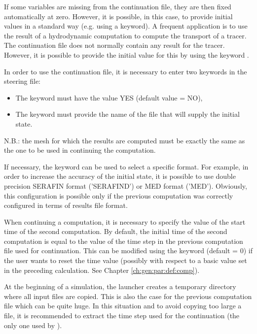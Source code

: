 If some variables are missing from the continuation file,
they are then fixed automatically at zero.
However, it is possible, in this case, to provide initial values in a standard
way (e.g. using a keyword).
A frequent application is to use the result of a hydrodynamic computation
to compute the transport of a tracer.
The continuation file does not normally contain any result for the tracer.
However, it is possible to provide the initial value for this by using
the keyword .

In order to use the continuation file, it is necessary to enter
two keywords in the steering file:

\begin{itemize}
\item The keyword  must have the value YES
(default value = NO),

\item The keyword  must provide
the name of the file that will supply the initial state.
\end{itemize}

N.B.: the mesh for which the results are computed must be exactly the same
as the one to be used in continuing the computation.

If necessary, the keyword 
can be used to select a specific format.
For example, in order to increase the accuracy of the initial state,
it is possible to use double precision SERAFIN format ('SERAFIND') or
MED format ('MED').
Obviously, this configuration is possible only if the previous computation
was correctly configured in terms of results file format.

When continuing a computation, it is necessary to specify the value of
the start time of the second computation.
By default, the initial time of the second computation is equal to the value
of the time step in the previous computation file used for continuation.
This can be modified using the keyword 
(default = 0)
if the user wants to reset the time value (possibly with respect to a basic
value set in the preceding calculation.
See Chapter \ref{ch:gen:par:def:comp}).

At the beginning of a simulation, the launcher creates a temporary directory
where all input files are copied.
This is also the case for the previous computation file which can be quite huge.
In this situation and to avoid copying too large a file,
it is recommended to extract the time step used for the continuation
(the only one used by ).


